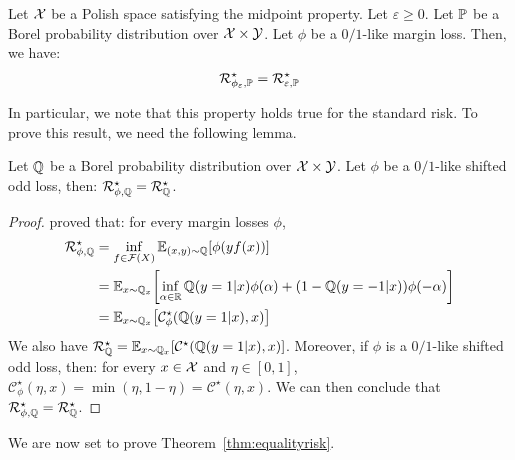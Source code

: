 \begin{thm}


\label{thm:equalityrisk}
Let $\mathcal{X}$ be a Polish space satisfying the midpoint property. Let $\varepsilon\geq 0$. Let $\mathbb{P}$ be a Borel probability distribution over $\mathcal{X}\times\mathcal{Y}$. Let ${\phi}$ be a $0/1$-like margin loss. Then, we have:
\begin{align*}
\mathcal{R}^\star_{{\phi}_\varepsilon,\mathbb{P}} = \mathcal{R}^\star_{\varepsilon,\mathbb{P}}
\end{align*}
\end{thm}

In particular, we note that this property holds true for the standard risk. To prove this result, we need the following lemma.


\begin{lemma}
    \label{lem:equalityriskstandard}
    Let $\mathbb{Q}$ be a Borel probability distribution over $\mathcal{X}\times\mathcal{Y}$. Let ${\phi}$ be a $0/1$-like shifted odd loss, then: $\mathcal{R}_{\phi,\mathbb{Q}}^\star =\mathcal{R}_{\mathbb{Q}}^\star$.
    \end{lemma}
    
    \begin{proof}
    \citet{bartlett2006convexity,steinwart2007compare} proved that: for every margin losses $\phi$,
    \begin{align*}
        \risk_{\phi,\QQ}^\star &= \inf_{f\in\mathcal{F}(X)}\mathbb{E}_{(x,y)\sim\QQ}\left[\phi(yf(x))\right] 
        \\&= \mathbb{E}_{x\sim\QQ_x}\left[\inf_{\alpha\in\RR}\QQ(y=1|x)\phi(\alpha)+(1-\QQ(y=-1|x))\phi(-\alpha)\right]\\
        &= \mathbb{E}_{x\sim\QQ_x}\left[\mathcal{C}_\phi^\star(\QQ(y=1|x),x)\right]\\
    \end{align*}
    We also have $ \risk_{\QQ}^\star =\mathbb{E}_{x\sim\QQ_x}\left[\mathcal{C}^\star(\QQ(y=1|x),x)\right] $. Moreover, if $\phi$ is a $0/1$-like shifted odd loss, then: for every $x\in\mathcal{X}$ and $\eta\in[0,1]$, $\mathcal{C}_\phi^\star(\eta,x) =\min(\eta,1-\eta)=\mathcal{C}^\star(\eta,x)$. We can then conclude that  $\mathcal{R}_{\phi,\mathbb{Q}}^\star =\mathcal{R}_{\mathbb{Q}}^\star$.
    \end{proof}
    
    We are now set to prove Theorem~\ref{thm:equalityrisk}.
    
